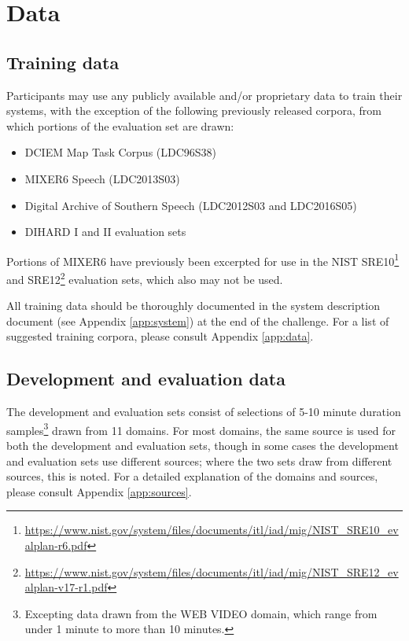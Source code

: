 \documentclass{article}
\begin{document}
\section{Data}
\label{sec:data}
\subsection{Training data}
\label{sec:data:train}
Participants may use any publicly available and/or proprietary data to train their systems, with the exception of the following previously released corpora, from which portions of the evaluation set are drawn:
%
\begin{itemize}
    \item DCIEM Map Task Corpus (LDC96S38)
    \item MIXER6 Speech (LDC2013S03)
    \item Digital Archive of Southern Speech (LDC2012S03 and LDC2016S05)
    \item DIHARD I and II evaluation sets
\end{itemize}
%
Portions of MIXER6 have previously been excerpted for use in the NIST SRE10\footnote{\url{https://www.nist.gov/system/files/documents/itl/iad/mig/NIST_SRE10_evalplan-r6.pdf}} and SRE12\footnote{\url{https://www.nist.gov/system/files/documents/itl/iad/mig/NIST_SRE12_evalplan-v17-r1.pdf}} evaluation sets, which also may not be used.

All training data should be thoroughly documented in the system description document (see Appendix \ref{app:system}) at the end of the challenge. For a list of suggested training corpora, please consult Appendix \ref{app:data}. 


\subsection{Development and evaluation data}
\label{sec:singlechannel}
The development and evaluation sets consist of  selections of 5-10 minute duration samples\footnote{Excepting data drawn from the WEB VIDEO domain, which range from under 1 minute to more than 10 minutes.} drawn from 11 domains. For most domains, the same source is used for both the development and evaluation sets, though in some cases the development and evaluation sets use different sources; where the two sets draw from different sources, this is noted. For a detailed explanation of the domains and sources, please consult Appendix \ref{app:sources}.
\end{document}
